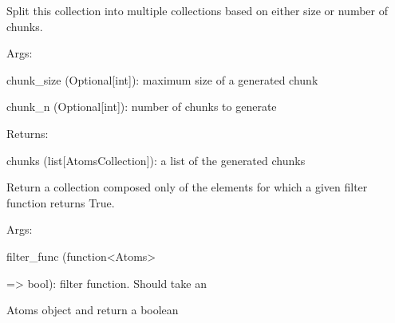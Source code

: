 \documentclass[letterpaper,10pt,english]{sphinxmanual}
\begin{document}
\begin{fulllineitems}

\begin{fulllineitems}
\label{doctree/soprano.collection.collection:soprano.collection.collection.AtomsCollection.chunkify}
Split this collection into multiple collections based on either
size or number of chunks.

\begin{DUlineblock}{0em}
\item[] Args:
\item[]
\begin{DUlineblock}{\DUlineblockindent}
\item[] chunk\_size (Optional{[}int{]}): maximum size of a generated chunk
\item[] chunk\_n (Optional{[}int{]}): number of chunks to generate
\end{DUlineblock}
\end{DUlineblock}

\begin{DUlineblock}{0em}
\item[] Returns:
\item[]
\begin{DUlineblock}{\DUlineblockindent}
\item[] chunks (list{[}AtomsCollection{]}): a list of the generated chunks
\end{DUlineblock}
\end{DUlineblock}

\end{fulllineitems}


\begin{fulllineitems}
\label{doctree/soprano.collection.collection:soprano.collection.collection.AtomsCollection.filter}
Return a collection composed only of the elements for which a given
filter function returns True.

\begin{DUlineblock}{0em}
\item[] Args:
\item[]
\begin{DUlineblock}{\DUlineblockindent}
\item[] filter\_func (function\textless{}Atoms\textgreater{}
\item[]
\begin{DUlineblock}{\DUlineblockindent}
\item[] =\textgreater{} bool): filter function. Should take an
\item[]
\begin{DUlineblock}{\DUlineblockindent}
\item[] Atoms object and return a boolean
\end{DUlineblock}
\end{DUlineblock}
\end{DUlineblock}
\end{DUlineblock}


\end{fulllineitems}
\end{fulllineitems}
\end{document}
